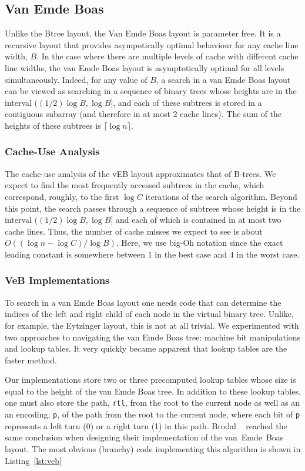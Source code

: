 \documentclass{patmorin}
\newcommand{\lstref}[1]{Listing~\ref{lst:#1}}
\begin{document}
\subsection{Van Emde Boas}

Unlike the Btree layout, the Van Emde Boas layout is parameter free.
It is a recursive layout that provides asympotically optimal behaviour
for any cache line width, $B$.  In the case where there are multiple
levels of cache with different cache line widths, the van Emde Boas
layout is asymptotically optimal for all levels simultaneously.  Indeed,
for any value of $B$, a search in a van Emde Boas layout can be viewed
as searching in a sequence of binary trees whose heights are in the
interval $((1/2)\log B,\log B]$, and each of these subtrees is stored
in a contiguous subarray (and therefore in at most 2 cache lines).
The sum of the heights of these subtrees is $\lceil\log n\rceil$.


\subsubsection{Cache-Use Analysis}

The cache-use analysis of the vEB layout approximates that of B-trees.
We expect to find the most frequently accessed subtrees in the cache,
which correspond, roughly, to the first $\log C$ iterations of the search
algorithm.  Beyond this point, the search passes through a sequence of
subtrees whose height is in the interval $((1/2)\log B,\log B]$ and each of
which is contained in at most two cache lines.  Thus, the number of cache
misses we expect to see is about $O((\log n - \log C)/\log B)$.  Here,
we use big-Oh notation since the exact leading constant is somewhere
between $1$ in the best case and $4$ in the worst case.

\subsubsection{VeB Implementations}

To search in a van Emde Boas layout one needs code that can determine
the indices of the left and right child of each node in the virtual
binary tree.  Unlike, for example, the Eytzinger layout, this is not at
all trivial. We experimented with two approaches to navigating the van
Emde Boas tree: machine bit manipulations and lookup tables.  It very
quickly became apparent that lookup tables are the faster method.

Our implementations store two or three precomputed lookup tables whose
size is equal to the height of the van Emde Boas tree. In addition to
these lookup tables, one must also store the path, \texttt{rtl},
from the root to the current node as well as an an encoding,
\texttt{p}, of the path from the root to the current node, where
each bit of \texttt{p} represents a left turn (0) or a right
turn (1) in this path.  Brodal \etal\ \cite{brodal.fagerberg.ea:cache}
reached the same conclusion when designing their implementation of the
van~Emde~Boas layout.  The most obvious (branchy) code implementing this
algorithm is shown in \lstref{veb}
\end{document}
